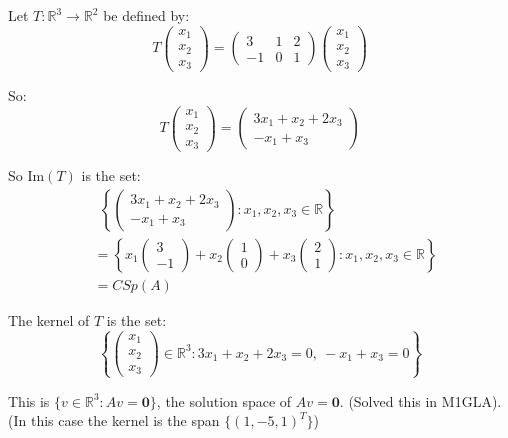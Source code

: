 \documentclass[10pt]{scrartcl}
\begin{document}
\begin{example} Let $T : \mathbb{R}^3 \to \mathbb{R}^2$ be defined by:
\[ 
T\begin{pmatrix}
x_1 \\
x_2 \\
x_3 \end{pmatrix}
= 
\begin{pmatrix}
3 & 1& 2\\
-1 & 0 & 1\end{pmatrix}
\begin{pmatrix}
x_1 \\
x_2 \\
x_3 \end{pmatrix}
\] 

So: 
 \[ 
T\begin{pmatrix}
x_1 \\
x_2 \\
x_3 \end{pmatrix} 
= 
\begin{pmatrix}
3x_1 + x_2 + 2x_3\\
-x_1 + x_3\end{pmatrix} 
\] 

So Im$(T)$ is the set:
 \[ 
 \begin{aligned}
&~~ \left\{  \begin{pmatrix}
3x_1 + x_2 + 2x_3\\
-x_1 + x_3\end{pmatrix} 
: x_1, x_2, x_3 \in \mathbb{R}
\right\} \\
&= \left\{
x_1 \begin{pmatrix}3\\-1\end{pmatrix} + 
x_2 \begin{pmatrix}1\\0\end{pmatrix}+
x_3\begin{pmatrix}2\\1\end{pmatrix}
: x_1, x_2, x_3 \in \mathbb{R}
\right\} \\
&= CSp(A)
\end{aligned}
\] \vspace*{5pt}


The kernel of $T$ is the set: 
\[
\left\{
\left(\begin{smallmatrix}x_1\\x_2\\x_3\end{smallmatrix}\right) \in \mathbb{R}^3: 
3x_1 + x_2 + 2x_3 = 0,~ -x_1 + x_3 = 0
\right\}\]

This is $\{v \in \mathbb{R}^3: Av = \mathbf{0}\}$, the solution space of $Av = \mathbf{0}$. (Solved this in M1GLA). (In this case the kernel is the span $\{ (1,-5,1)^T \}$)
\end{example}\vspace*{10pt}
\end{document}
